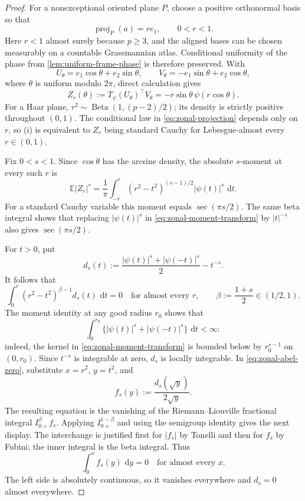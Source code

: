\documentclass[11pt]{article}
\numberwithin{equation}{section}
\theoremstyle{thmstyleone}%
\theoremstyle{thmstyletwo}%
\let\cref\autoref
\newcommand{\E}{\mathbb E}
\newcommand{\dd}{\,\mathrm d}
\newcommand{\Beta}{\operatorname{Beta}}
\begin{document}
\begin{proof}
For a nonexceptional oriented plane \(P\), choose a positive orthonormal
basis so that
\[
  \operatorname{proj}_P(a)=r e_1,
  \qquad 0<r<1.
\]
Here \(r<1\) almost surely because \(p\geq3\), and the aligned bases can be
chosen measurably on a countable Grassmannian atlas.  Conditional uniformity
of the phase from \cref{lem:uniform-frame-phase} is therefore preserved.
With
\[
  U_\theta=e_1\cos\theta+e_2\sin\theta,
  \qquad
  V_\theta=-e_1\sin\theta+e_2\cos\theta,
\]
where \(\theta\) is uniform modulo \(2\pi\), direct calculation gives
\begin{equation}
  Z_r(\theta)
  :=
  T_\psi(U_\theta)^\top V_\theta
  =
  -r\sin\theta\,\psi(r\cos\theta).
  \label{eq:zonal-projection}
\end{equation}
For a Haar plane,
\(r^2\sim\Beta(1,(p-2)/2)\); its density is strictly positive throughout
\((0,1)\).  The conditional law in \cref{eq:zonal-projection} depends only
on \(r\), so \textup{(i)} is equivalent to \(Z_r\) being standard Cauchy
for Lebesgue-almost every \(r\in(0,1)\).

Fix \(0<s<1\).  Since \(\cos\theta\) has the arcsine density, the absolute
\(s\)-moment at every such \(r\) is
\begin{equation}
  \E|Z_r|^s
  =
  \frac1\pi
  \int_{-r}^r
  (r^2-t^2)^{(s-1)/2}|\psi(t)|^s\,\dd t.
  \label{eq:zonal-moment-transform}
\end{equation}
For a standard Cauchy variable this moment equals
\(\sec(\pi s/2)\).  The same beta integral shows that replacing
\(|\psi(t)|^s\) in \cref{eq:zonal-moment-transform} by \(|t|^{-s}\)
also gives \(\sec(\pi s/2)\).

For \(t>0\), put
\[
  d_s(t)
  :=
  \frac{|\psi(t)|^s+|\psi(-t)|^s}{2}-t^{-s}.
\]
It follows that
\begin{equation}
  \int_0^r
  (r^2-t^2)^{\beta-1}d_s(t)\,\dd t=0
  \quad\text{for almost every }r,
  \qquad
  \beta:=\frac{1+s}{2}\in(1/2,1).
  \label{eq:zonal-abel-zero}
\end{equation}
The moment identity at any good radius \(r_0\) shows that
\[
  \int_0^{r_0}
  \bigl\{|\psi(t)|^s+|\psi(-t)|^s\bigr\}\,\dd t<\infty:
\]
indeed, the kernel in \cref{eq:zonal-moment-transform} is bounded below by
\(r_0^{s-1}\) on \((0,r_0)\).  Since \(t^{-s}\) is integrable at zero,
\(d_s\) is locally integrable.  In
\cref{eq:zonal-abel-zero}, substitute \(x=r^2\), \(y=t^2\), and
\[
  f_s(y):=\frac{d_s(\sqrt y)}{2\sqrt y}.
\]
The resulting equation is the vanishing of the
Riemann--Liouville fractional integral \(I_{0+}^{\beta}f_s\).  Applying
\(I_{0+}^{1-\beta}\) and using the semigroup identity gives the next
display.  The interchange is justified first for \(|f_s|\) by Tonelli and
then for \(f_s\) by Fubini; the inner integral is the beta integral.  Thus
\[
  \int_0^x f_s(y)\,\dd y=0
  \quad\text{for almost every }x.
\]
The left side is absolutely continuous, so it vanishes everywhere and
\(d_s=0\) almost everywhere.


\end{proof}
\end{document}

